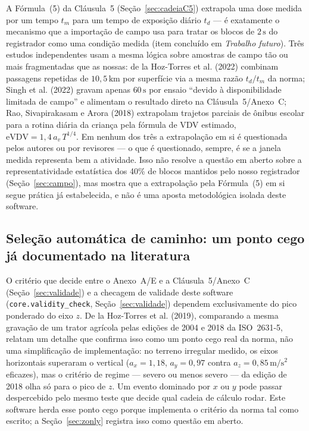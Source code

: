 \documentclass[11pt,a4paper]{article}
\newcommand{\code}[1]{\texttt{\small #1}}
\newcommand{\unit}[2]{\ensuremath{#1\,\mathrm{#2}}}
\begin{document}
A Fórmula~(5) da Cláusula~5 (Seção~\ref{sec:cadeiaC5}) extrapola uma dose
medida por um tempo $t_m$ para um tempo de exposição diário $t_d$ --- é
exatamente o mecanismo que a importação de campo usa para tratar os blocos de
\unit{2}{s} do registrador como uma condição medida (item concluído em
\emph{Trabalho futuro}). Três estudos independentes usam a mesma lógica sobre
amostras de campo tão ou mais fragmentadas que as nossas: de la
Hoz-Torres et al. (2022) combinam passagens repetidas de \unit{10{,}5}{km} por
superfície via a mesma razão $t_d/t_m$ da norma; Singh et al. (2022) gravam
apenas \unit{60}{s} por ensaio ``devido à disponibilidade limitada de campo'' e
alimentam o resultado direto na Cláusula~5/Anexo~C; Rao, Sivapirakasam e Arora
(2018) extrapolam trajetos parciais de ônibus escolar para a rotina diária da
criança pela fórmula de VDV estimado, $\mathrm{eVDV} = 1{,}4\,a_v\,T^{1/4}$. Em
nenhum dos três a extrapolação em si é questionada pelos autores ou por
revisores --- o que é questionado, sempre, é se a janela medida representa bem
a atividade. Isso não resolve a questão em aberto sobre a representatividade
estatística dos 40\% de blocos mantidos pelo nosso registrador
(Seção~\ref{sec:campo}), mas mostra que a extrapolação pela Fórmula~(5) em si
segue prática já estabelecida, e não é uma aposta metodológica isolada deste
software.

\subsection{Seleção automática de caminho: um ponto cego já documentado na literatura}
\label{sec:pontocego}

O critério que decide entre o Anexo~A/E e a Cláusula~5/Anexo~C
(Seção~\ref{sec:validade}) e a checagem de validade deste software
(\code{core.validity\_check}, Seção~\ref{sec:validade}) dependem exclusivamente
do pico ponderado do eixo $z$. De la Hoz-Torres et al. (2019), comparando a
mesma gravação de um trator agrícola pelas edições de 2004 e 2018 da
ISO~2631-5, relatam um detalhe que confirma isso como um ponto cego real da
norma, não uma simplificação de implementação: no terreno irregular medido, os
eixos horizontais superaram o vertical ($a_x = 1{,}18$, $a_y = 0{,}97$ contra
$a_z = 0{,}85\,\mathrm{m/s^2}$ eficazes), mas o critério de regime --- severo ou
menos severo --- da edição de 2018 olha só para o pico de $z$. Um evento
dominado por $x$ ou $y$ pode passar despercebido pelo mesmo teste que decide
qual cadeia de cálculo rodar. Este software herda esse ponto cego porque
implementa o critério da norma tal como escrito; a Seção~\ref{sec:zonly}
registra isso como questão em aberto.
\end{document}
